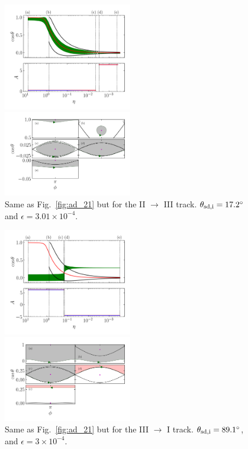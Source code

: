 \documentclass[
        fleqn,
        usenatbib,
    ]{mnras}
\begin{document}
\begin{figure}
    \centering
    \includegraphics[width=0.5\textwidth]{plots_diskdisp/3testo23.png}

    \includegraphics[width=0.5\textwidth]{plots_diskdisp/3testo23_subplots.png}
    \caption{Same as Fig.~\ref{fig:ad_21} but for the II $\to$ III track.
    $\theta_{\rm sd, i} = 17.2^\circ$ and $\epsilon = 3.01 \times
    10^{-4}$.}\label{fig:ad_23}
\end{figure}
\begin{figure}
    \centering
    \includegraphics[width=0.5\textwidth]{plots_diskdisp/3testo31.png}

    \includegraphics[width=0.5\textwidth]{plots_diskdisp/3testo31_subplots.png}
    \caption{Same as Fig.~\ref{fig:ad_21} but for the III $\to$ I track.
    $\theta_{\rm sd, i} = 89.1^\circ$, and $\epsilon = 3 \times
    10^{-4}$.}\label{fig:ad_31}
\end{figure}
\end{document}

